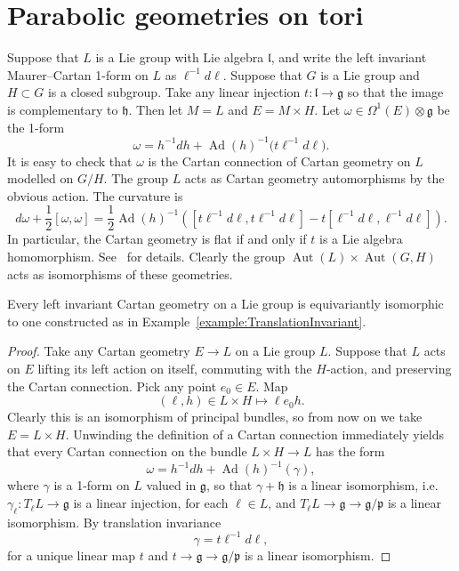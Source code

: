 \documentclass[pdftex]{sigma}
\newcommand{\nForms}[2]{\ensuremath{\Omega^{#1} \left ( {#2} \right
    )}}
\DeclareMathOperator{\Ad}{Ad}
\DeclareMathOperator{\Aut}{Aut}
\newcommand{\LieG}{\ensuremath{\mathfrak{g}}}
\newcommand{\LieH}{\ensuremath{\mathfrak{h}}}
\newcommand{\LieL}{\ensuremath{\mathfrak{l}}}
\newcommand{\gtot}{\mathfrak{g}}
\newcommand{\gstruc}{\mathfrak{p}}
\begin{document}
\section{Parabolic geometries on tori}

\begin{example}\label{example:TranslationInvariant}
Suppose that $L$ is a Lie group with Lie algebra $\LieL$,
and write the left invariant Maurer--Cartan 1-form
on $L$ as $\ell^{-1}   d\ell$.
Suppose that $G$ is a Lie group and $H \subset G$
is a closed subgroup. Take any linear injection $t : \LieL \to \LieG$
so that the image is complementary to $\LieH$.
Then let $M=L$ and $E=M \times H$. Let $\omega \in \nForms{1}{E} \otimes  \LieG$
be the 1-form
\[
\omega = h^{-1}   dh + \Ad(h)^{-1}\big(t   \ell^{-1}   d\ell\big).
\]
It is easy to check that $\omega$ is the Cartan
connection of Cartan geometry on $L$ modelled on $G/H$.
The group $L$ acts as Cartan geometry automorphisms
by the obvious action. The curvature is
\[
d \omega + \frac{1}{2}\left[\omega,\omega\right]
=
\frac{1}{2}
\Ad(h)^{-1}\left(
\left[
t \ell^{-1}   d\ell,
t \ell^{-1}   d\ell
\right]
-
t
\left[
\ell^{-1}   d\ell,
\ell^{-1}   d\ell
\right]
\right).
\]
In particular, the Cartan geometry is f\/lat if and only if
$t$ is a Lie algebra homomorphism. See~\cite{Hammerl:2007}
for details. Clearly the group $\Aut(L) \times \Aut(G,H)$
acts as isomorphisms of these geometries.
\end{example}


\begin{lemma} Every left invariant Cartan geometry on a
Lie group is equivariantly isomorphic to one
constructed as in Example~{\rm \ref{example:TranslationInvariant}}.
\end{lemma}
\begin{proof}
Take any Cartan geometry $E \to L$ on a Lie group $L$.
Suppose that $L$ acts on $E$ lifting its left action
on itself, commuting with the $H$-action,
and preserving the Cartan connection.
Pick any point $e_0 \in E$. Map
\[
\left(\ell,h\right) \in L \times H \mapsto \ell e_0 h.
\]
Clearly this is an isomorphism of principal bundles,
so from now on we take $E=L \times H$.
Unwinding the def\/inition of a Cartan connection immediately yields
that every Cartan connection on the bundle $L \times H \to L$ has the form
\[
\omega = h^{-1}   dh + \Ad(h)^{-1} \left(\gamma\right),
\]
where $\gamma$ is a 1-form on $L$ valued in $\LieG$,
so that $\gamma+\LieH$ is a linear isomorphism,
i.e.\ $\gamma_{\ell} : T_{\ell} L \to \gtot$ is a
linear injection, for each $\ell \in L$, and
$T_{\ell} L \to \gtot \to \gtot/\gstruc$ is a linear isomorphism.
By translation invariance
\[
\gamma = t \ell^{-1}   d\ell,
\]
for a unique linear map $t$ and
$t \to \gtot \to \gtot/\gstruc$ is a linear isomorphism.
\end{proof}
\end{document}
